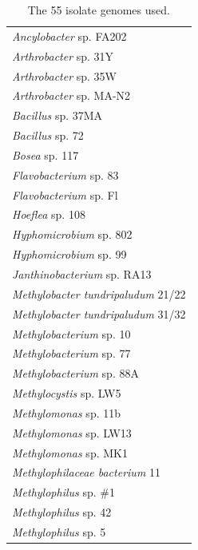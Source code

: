 \begin{singlespace}
\begin{longtable}{p{}}
\caption[The 55 isolate genomes used]
	{The 55 isolate genomes used.}
\label{table:55genomes}
\endfirsthead
\endhead
\midrule
               \textit{Ancylobacter} sp. FA202 \\
                 \textit{Arthrobacter} sp. 31Y \\
                 \textit{Arthrobacter} sp. 35W \\
               \textit{Arthrobacter} sp. MA-N2 \\
                    \textit{Bacillus} sp. 37MA \\
                      \textit{Bacillus} sp. 72 \\
                        \textit{Bosea} sp. 117 \\
                \textit{Flavobacterium} sp. 83 \\
                \textit{Flavobacterium} sp. Fl \\
                      \textit{Hoeflea} sp. 108 \\
               \textit{Hyphomicrobium} sp. 802 \\
                \textit{Hyphomicrobium} sp. 99 \\
           \textit{Janthinobacterium} sp. RA13 \\
    \textit{Methylobacter tundripaludum} 21/22 \\
    \textit{Methylobacter tundripaludum} 31/32 \\
              \textit{Methylobacterium} sp. 10 \\
              \textit{Methylobacterium} sp. 77 \\
             \textit{Methylobacterium} sp. 88A \\
                \textit{Methylocystis} sp. LW5 \\
                 \textit{Methylomonas} sp. 11b \\
                \textit{Methylomonas} sp. LW13 \\
                 \textit{Methylomonas} sp. MK1 \\
        \textit{Methylophilaceae bacterium} 11 \\
                 \textit{Methylophilus} sp. \#1 \\
                 \textit{Methylophilus} sp. 42 \\
                  \textit{Methylophilus} sp. 5 \\

\end{longtable}
\end{singlespace}

